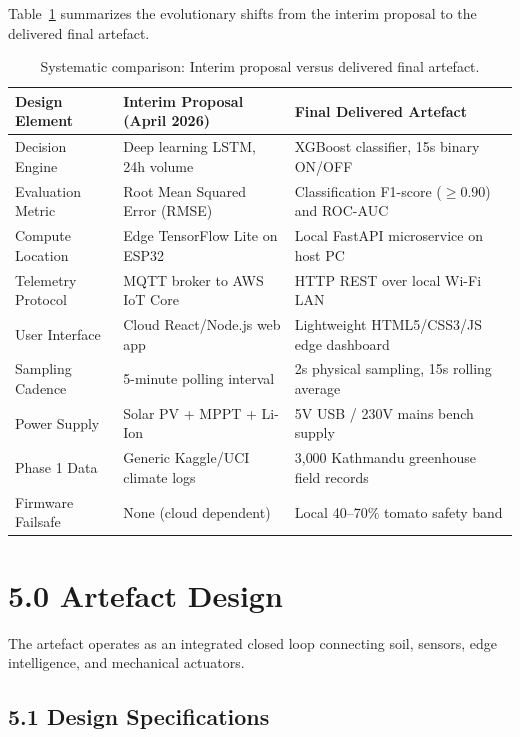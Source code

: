 \documentclass[12pt, a4paper]{article}
\begin{document}
Table~\ref{tab:interim-vs-final} summarizes the evolutionary shifts from the interim proposal to the delivered final artefact.

\begin{table}[H]
\centering
\caption{Systematic comparison: Interim proposal versus delivered final artefact.}
\label{tab:interim-vs-final}
\begin{tabularx}{\textwidth}{>{\raggedright\arraybackslash}p{3.2cm} X X}
\toprule
\textbf{Design Element} & \textbf{Interim Proposal (April 2026)} & \textbf{Final Delivered Artefact} \\
\midrule
Decision Engine & Deep learning LSTM, 24h volume & XGBoost classifier, 15s binary ON/OFF \\
Evaluation Metric & Root Mean Squared Error (RMSE) & Classification F1-score ($\ge 0.90$) and ROC-AUC \\
Compute Location & Edge TensorFlow Lite on ESP32 & Local FastAPI microservice on host PC \\
Telemetry Protocol & MQTT broker to AWS IoT Core & HTTP REST over local Wi-Fi LAN \\
User Interface & Cloud React/Node.js web app & Lightweight HTML5/CSS3/JS edge dashboard \\
Sampling Cadence & 5-minute polling interval & 2s physical sampling, 15s rolling average \\
Power Supply & Solar PV + MPPT + Li-Ion & 5V USB / 230V mains bench supply \\
Phase 1 Data & Generic Kaggle/UCI climate logs & 3{,}000 Kathmandu greenhouse field records \\
Firmware Failsafe & None (cloud dependent) & Local 40--70\% tomato safety band \\
\bottomrule
\end{tabularx}
\end{table}

\section{5.0 Artefact Design}
\label{sec:artefact}

The artefact operates as an integrated closed loop connecting soil, sensors, edge intelligence, and mechanical actuators.

\subsection{5.1 Design Specifications}
\label{sec:specs}
\end{document}
